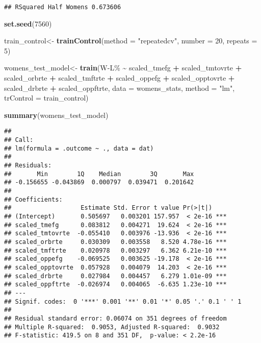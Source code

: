\documentclass[
]{article}
\newenvironment{Shaded}{\begin{snugshade}}{\end{snugshade}}
\newcommand{\AttributeTok}[1]{\textcolor[rgb]{0.13,0.29,0.53}{#1}}
\newcommand{\DecValTok}[1]{\textcolor[rgb]{0.00,0.00,0.81}{#1}}
\newcommand{\FunctionTok}[1]{\textcolor[rgb]{0.13,0.29,0.53}{\textbf{#1}}}
\newcommand{\NormalTok}[1]{#1}
\newcommand{\OtherTok}[1]{\textcolor[rgb]{0.56,0.35,0.01}{#1}}
\newcommand{\SpecialCharTok}[1]{\textcolor[rgb]{0.81,0.36,0.00}{\textbf{#1}}}
\newcommand{\StringTok}[1]{\textcolor[rgb]{0.31,0.60,0.02}{#1}}
\begin{document}
\begin{verbatim}
## RSquared Half Womens 0.673606
\end{verbatim}

\begin{Shaded}
\begin{Highlighting}[]
\FunctionTok{set.seed}\NormalTok{(}\DecValTok{7560}\NormalTok{)}

\NormalTok{train\_control}\OtherTok{\textless{}{-}} \FunctionTok{trainControl}\NormalTok{(}\AttributeTok{method =} \StringTok{"repeatedcv"}\NormalTok{, }\AttributeTok{number =} \DecValTok{20}\NormalTok{, }\AttributeTok{repeats =} \DecValTok{5}\NormalTok{)}

\NormalTok{womens\_test\_model}\OtherTok{\textless{}{-}} \FunctionTok{train}\NormalTok{(}\StringTok{\textasciigrave{}}\AttributeTok{W{-}L\%}\StringTok{\textasciigrave{}} \SpecialCharTok{\textasciitilde{}}\NormalTok{ scaled\_tmefg }\SpecialCharTok{+}\NormalTok{ scaled\_tmtovrte }\SpecialCharTok{+}\NormalTok{ scaled\_orbrte }\SpecialCharTok{+}\NormalTok{ scaled\_tmftrte }\SpecialCharTok{+}\NormalTok{ scaled\_oppefg }\SpecialCharTok{+}\NormalTok{ scaled\_opptovrte }\SpecialCharTok{+}\NormalTok{ scaled\_drbrte }\SpecialCharTok{+}\NormalTok{ scaled\_oppftrte, }\AttributeTok{data =}\NormalTok{ womens\_stats, }\AttributeTok{method =} \StringTok{"lm"}\NormalTok{, }\AttributeTok{trControl =}\NormalTok{ train\_control)}

\FunctionTok{summary}\NormalTok{(womens\_test\_model)}
\end{Highlighting}
\end{Shaded}

\begin{verbatim}
## 
## Call:
## lm(formula = .outcome ~ ., data = dat)
## 
## Residuals:
##       Min        1Q    Median        3Q       Max 
## -0.156655 -0.043869  0.000797  0.039471  0.201642 
## 
## Coefficients:
##                   Estimate Std. Error t value Pr(>|t|)    
## (Intercept)       0.505697   0.003201 157.957  < 2e-16 ***
## scaled_tmefg      0.083812   0.004271  19.624  < 2e-16 ***
## scaled_tmtovrte  -0.055410   0.003976 -13.936  < 2e-16 ***
## scaled_orbrte     0.030309   0.003558   8.520 4.78e-16 ***
## scaled_tmftrte    0.020978   0.003297   6.362 6.21e-10 ***
## scaled_oppefg    -0.069525   0.003625 -19.178  < 2e-16 ***
## scaled_opptovrte  0.057928   0.004079  14.203  < 2e-16 ***
## scaled_drbrte     0.027984   0.004457   6.279 1.01e-09 ***
## scaled_oppftrte  -0.026974   0.004065  -6.635 1.23e-10 ***
## ---
## Signif. codes:  0 '***' 0.001 '**' 0.01 '*' 0.05 '.' 0.1 ' ' 1
## 
## Residual standard error: 0.06074 on 351 degrees of freedom
## Multiple R-squared:  0.9053, Adjusted R-squared:  0.9032 
## F-statistic: 419.5 on 8 and 351 DF,  p-value: < 2.2e-16
\end{verbatim}
\end{document}

